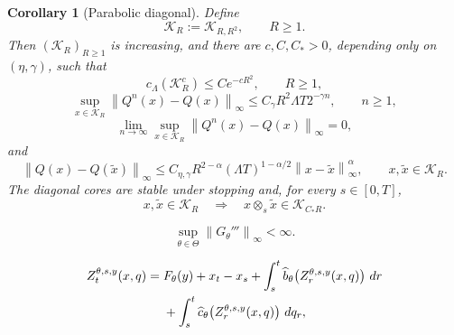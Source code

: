 \documentclass[10pt,a4paper]{amsart}
\newtheorem{corollary}{Corollary}
\newcommand{\cK}{\mathcal K}
\newcommand{\dd}{\,d}
\newcommand{\norm}[1]{\left\lVert #1\right\rVert}
\begin{document}
\begin{corollary}[Parabolic diagonal]
\label{cor:parabolic-core}
Define
\begin{equation}\label{eq:parabolic-core}
  \cK_R:=\cK_{R,R^2},
  \qquad R\ge1.
\end{equation}
Then \((\cK_R)_{R\ge1}\) is increasing, and there are
\(c,C,C_*>0\), depending only on \((\eta,\gamma)\), such that
\begin{equation}\label{eq:core-capacity-rate}
  c_\Lambda(\cK_R^c)\le Ce^{-cR^2},
  \qquad R\ge1,
\end{equation}
\begin{equation}\label{eq:qv-core-rate}
  \sup_{x\in\cK_R}\norm{Q^n(x)-Q(x)}_\infty
  \le C_\gamma R^2\Lambda T2^{-\gamma n},
  \qquad n\ge1,
\end{equation}
\begin{equation}\label{eq:qv-uniform-on-core}
  \lim_{n\to\infty}
  \sup_{x\in\cK_R}\norm{Q^n(x)-Q(x)}_\infty=0,
\end{equation}
and
\begin{equation}\label{eq:qv-core-modulus}
  \norm{Q(x)-Q(\widetilde x)}_\infty
  \le C_{\eta,\gamma}R^{2-\alpha}
       (\Lambda T)^{1-\alpha/2}
       \norm{x-\widetilde x}_\infty^\alpha,
  \qquad x,\widetilde x\in\cK_R.
\end{equation}
The diagonal cores are stable under stopping and, for every \(s\in[0,T]\),
\begin{equation}\label{eq:core-concatenation}
  x,\widetilde x\in\cK_R
  \quad\Longrightarrow\quad
  x\otimes_s\widetilde x\in\cK_{C_*R}.
\end{equation}
\end{corollary}

\begin{equation}\label{eq:G-third-bound}
  \sup_{\theta\in\Theta}\norm{G_\theta'''}_\infty<\infty .
\end{equation}

\begin{align}
  Z_t^{\theta,s,y}(x,q)
  ={}&F_\theta(y)+x_t-x_s
  +\int_s^t\widehat b_\theta
       \bigl(Z_r^{\theta,s,y}(x,q)\bigr)\,\dd r
  \notag\\
  &+\int_s^t\widehat c_\theta
       \bigl(Z_r^{\theta,s,y}(x,q)\bigr)\,\dd q_r,
  \label{eq:Lamperti-equation}
\end{align}
\end{document}
